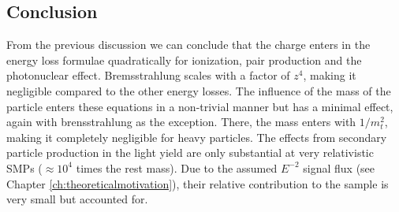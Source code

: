 \subsection{Conclusion}
\label{sub:energylossconclusion}
From the previous discussion we can conclude that the charge enters in the energy loss formulae quadratically for ionization, pair production and the photonuclear effect. Bremsstrahlung scales with a factor of $z^4$, making it negligible compared to the other energy losses. The influence of the mass of the particle enters these equations in a non-trivial manner but has a minimal effect, again with brensstrahlung as the exception. There, the mass enters with $1/m^2_t$, making it completely negligible for heavy particles. The effects from secondary particle production in the light yield are only substantial at very relativistic SMPs ($\approx 10^4$ times the rest mass). Due to the assumed $E^{-2}$ signal flux (see Chapter \ref{ch:theoreticalmotivation}), their relative contribution to the sample is very small but accounted for.
